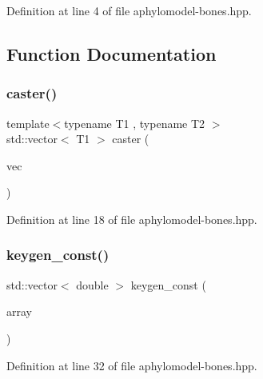 Definition at line 4 of file aphylomodel-\/bones.\+hpp.



\subsection{Function Documentation}
\mbox{\label{aphylomodel-bones_8hpp_a1f293b9028bf34b1aa8506c8f0af4413}} 
\subsubsection{\texorpdfstring{caster()}{caster()}}
{\footnotesize\ttfamily template$<$typename T1 , typename T2 $>$ \\
std\+::vector$<$ T1 $>$ caster (\begin{DoxyParamCaption}\item[{const std\+::vector$<$ T2 $>$ \&}]{vec }\end{DoxyParamCaption})}



Definition at line 18 of file aphylomodel-\/bones.\+hpp.

\mbox{\label{aphylomodel-bones_8hpp_a513c16e4b1a39f810501041e7b8fa448}} 
\subsubsection{\texorpdfstring{keygen\+\_\+const()}{keygen\_const()}}
{\footnotesize\ttfamily std\+::vector$<$ double $>$ keygen\+\_\+const (\begin{DoxyParamCaption}\item[{const \hyperlink{namespacebarry_1_1counters_1_1phylo_abd293bf65e494e903639fb5fb2c91604}{phylocounters\+::\+Phylo\+Array} \&}]{array }\end{DoxyParamCaption})\hspace{0.3cm}{\ttfamily [inline]}}



Definition at line 32 of file aphylomodel-\/bones.\+hpp.

\mbox{\label{aphylomodel-bones_8hpp_aa60134cca317d64e4b3d1707380d5d0d}} 
